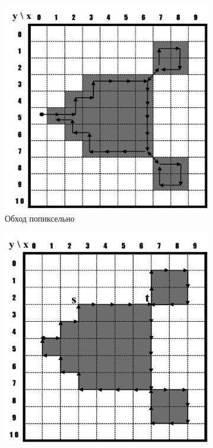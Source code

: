 \documentclass{fefu_thesis/cls/fefu}
\begin{document}
    \begin{figure}[H]
        \centering
        \begin{subfigure}[t]{0.32\linewidth}
            \centering
            \includegraphics[scale=0.36]{images/pixel_following_algorithm.png}
            \caption{Обход попиксельно}
        \end{subfigure}
        \begin{subfigure}[t]{0.32\linewidth}
            \centering
            \includegraphics[scale=0.36]{images/vertex_following-algorithm.png}

\end{subfigure}
\end{figure}
\end{document}
